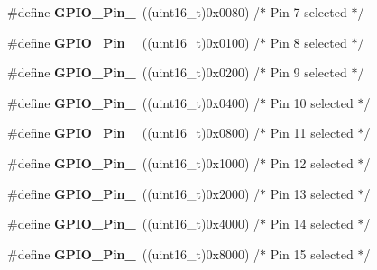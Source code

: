 \begin{DoxyCompactItemize}
\#define {\bfseries G\+P\+I\+O\+\_\+\+Pin\+\_}~((uint16\+\_\+t)0x0080)  /$\ast$ Pin 7 selected $\ast$/
\item 
\mbox{\label{group___g_p_i_o__pins__define_gac891f0984dc64af3567577fbf13ab304}} 
\#define {\bfseries G\+P\+I\+O\+\_\+\+Pin\+\_}~((uint16\+\_\+t)0x0100)  /$\ast$ Pin 8 selected $\ast$/
\item 
\mbox{\label{group___g_p_i_o__pins__define_gaad1891082d5d6bcac06c2729a9fdd2f0}} 
\#define {\bfseries G\+P\+I\+O\+\_\+\+Pin\+\_}~((uint16\+\_\+t)0x0200)  /$\ast$ Pin 9 selected $\ast$/
\item 
\mbox{\label{group___g_p_i_o__pins__define_ga726af6407ba60ac60f02057227c2d348}} 
\#define {\bfseries G\+P\+I\+O\+\_\+\+Pin\+\_}~((uint16\+\_\+t)0x0400)  /$\ast$ Pin 10 selected $\ast$/
\item 
\mbox{\label{group___g_p_i_o__pins__define_ga5139d5bc3d15784ae7794ed2ae1ff767}} 
\#define {\bfseries G\+P\+I\+O\+\_\+\+Pin\+\_}~((uint16\+\_\+t)0x0800)  /$\ast$ Pin 11 selected $\ast$/
\item 
\mbox{\label{group___g_p_i_o__pins__define_gada91257dcaab2c86f75fbd8e4b52b98c}} 
\#define {\bfseries G\+P\+I\+O\+\_\+\+Pin\+\_}~((uint16\+\_\+t)0x1000)  /$\ast$ Pin 12 selected $\ast$/
\item 
\mbox{\label{group___g_p_i_o__pins__define_ga4155a41c433f3657b9c79cfbd4240966}} 
\#define {\bfseries G\+P\+I\+O\+\_\+\+Pin\+\_}~((uint16\+\_\+t)0x2000)  /$\ast$ Pin 13 selected $\ast$/
\item 
\mbox{\label{group___g_p_i_o__pins__define_ga21cd1d89c0c061a6f09c5a842610bee5}} 
\#define {\bfseries G\+P\+I\+O\+\_\+\+Pin\+\_}~((uint16\+\_\+t)0x4000)  /$\ast$ Pin 14 selected $\ast$/
\item 
\mbox{\label{group___g_p_i_o__pins__define_gae686a9fc47cf3e420e5db0784210711d}} 
\#define {\bfseries G\+P\+I\+O\+\_\+\+Pin\+\_}~((uint16\+\_\+t)0x8000)  /$\ast$ Pin 15 selected $\ast$/

\end{DoxyCompactItemize}
